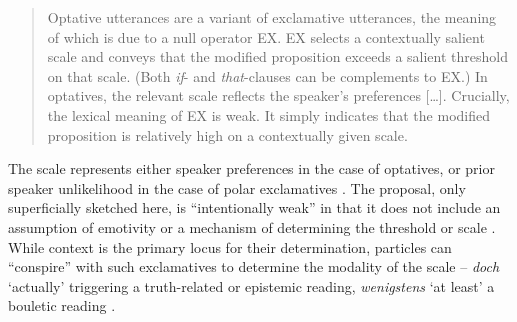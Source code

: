 \begin{exe}

\end{exe}


%			

\begin{quote}
Optative utterances are a variant of exclamative utterances, the meaning of which is due to a null operator EX. EX selects a contextually salient scale and conveys that the modified proposition exceeds a salient threshold on that scale. (Both \textit{if}- and \textit{that}-clauses can be complements to EX.) In optatives, the relevant scale reflects the speaker’s preferences [\ldots]. Crucially, the lexical meaning of EX is weak. It simply indicates that the modified proposition is relatively high on a contextually given scale. \citep[2]{Grosz.2012}
\end{quote}

The scale represents either speaker preferences in the case of optatives, or prior
speaker unlikelihood in the case of polar exclamatives \citep[65]{Grosz.2012}. The proposal, only superficially sketched here, is ``intentionally weak'' in that it does not include an assumption of emotivity or a mechanism of determining the threshold or scale \citep[72]{Grosz.2012}. While context is the primary locus for their determination, particles can ``conspire'' with such exclamatives to determine the modality of the scale – \textit{doch} `actually' triggering a truth-related or epistemic reading, \textit{wenigstens} `at least' a bouletic reading \citep[216--217]{Grosz.2012}. 

